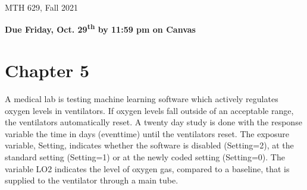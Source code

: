 \documentclass[12pt]{article}
\begin{document}
{
            \hfill {MTH 629, Fall 2021}}
\bigskip

{\bf Due Friday, Oct. 29\textsuperscript{th} by 11:59 pm on Canvas}

\section{Chapter 5}
\vspace{5pt}

A medical lab is testing machine learning software which actively regulates oxygen levels in ventilators. If oxygen levels fall outside of an acceptable range, the ventilators automatically reset. A twenty day study is done with the response variable the time in days (eventtime) until the ventilators reset. The exposure variable, Setting, indicates whether the software is disabled (Setting=2), at the standard setting (Setting=1) or at the newly coded setting (Setting=0). The variable LO2 indicates the level of oxygen gas, compared to a baseline, that is supplied to the ventilator through a main tube.
\\
\end{document}
